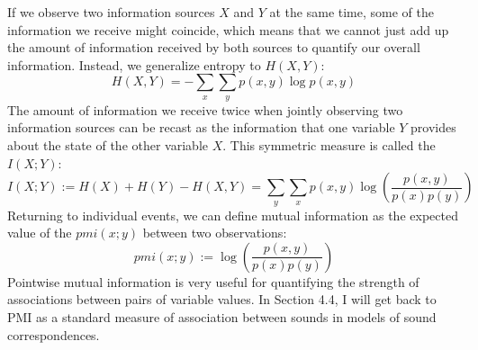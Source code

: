 If we observe two information sources $X$ and $Y$ at the same time, some of the information we receive might coincide, which means that we cannot just add up the amount of information received by both sources to quantify our overall information. Instead, we generalize entropy to \textit{} $H(X,Y)$:
 \begin{equation}
  H(X,Y) = -\sum_{x} \sum_{y} p(x,y) \log p(x,y)
 \end{equation}
The amount of information we receive twice when jointly observing two information sources can be recast as the information
that one variable $Y$ provides about the state of the other variable $X$. This symmetric measure
is called the \textit{} $I(X;Y)$:
 \begin{equation}
  I(X;Y) := H(X) + H(Y) - H(X,Y) = \sum_{y} \sum_{x} p(x,y) \log \left( \frac{p(x,y)}{p(x)p(y)} \right) 
 \end{equation}
Returning to individual events, we can define mutual information as the expected value of the \textit{} $pmi(x;y)$
between two observations:
 \begin{equation}
  pmi(x;y) := \log \left( \frac{p(x,y)}{p(x)p(y)} \right) 
 \end{equation}
Pointwise mutual information is very useful for quantifying the strength of associations between
pairs of variable values. In Section 4.4, I will get back to PMI as a standard measure 
of association between sounds in models of sound correspondences.


